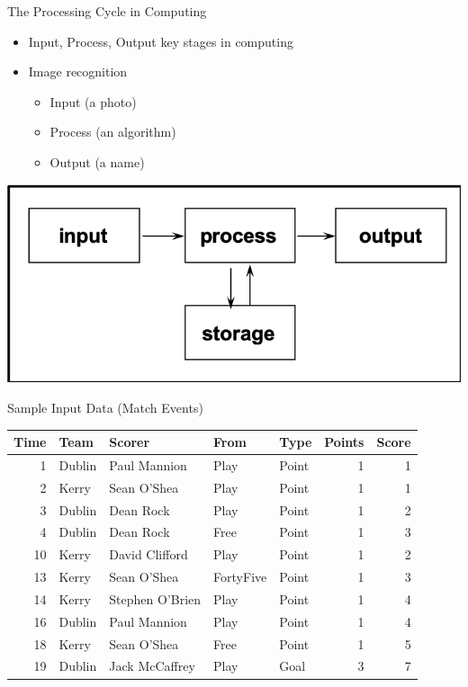 \documentclass[ignorenonframetext,]{beamer}
\providecommand{\tightlist}{%
  \setlength{\itemsep}{0pt}\setlength{\parskip}{0pt}}
\begin{document}
\begin{frame}{The Processing Cycle in Computing}
\protect\hypertarget{the-processing-cycle-in-computing}{}

\begin{itemize}
\tightlist
\item
  Input, Process, Output key stages in computing
\item
  Image recognition

  \begin{itemize}
  \tightlist
  \item
    Input (a photo)
  \item
    Process (an algorithm)
  \item
    Output (a name)
  \end{itemize}
\end{itemize}

\includegraphics[width=0.7\linewidth]{images/01 Processing}

\end{frame}

\begin{frame}{Sample Input Data (Match Events)}
\protect\hypertarget{sample-input-data-match-events}{}

\begin{longtable}[]{@{}rllllrr@{}}
\toprule
Time & Team & Scorer & From & Type & Points & Score\tabularnewline
\midrule
\endhead
1 & Dublin & Paul Mannion & Play & Point & 1 & 1\tabularnewline
2 & Kerry & Sean O'Shea & Play & Point & 1 & 1\tabularnewline
3 & Dublin & Dean Rock & Play & Point & 1 & 2\tabularnewline
4 & Dublin & Dean Rock & Free & Point & 1 & 3\tabularnewline
10 & Kerry & David Clifford & Play & Point & 1 & 2\tabularnewline
13 & Kerry & Sean O'Shea & FortyFive & Point & 1 & 3\tabularnewline
14 & Kerry & Stephen O'Brien & Play & Point & 1 & 4\tabularnewline
16 & Dublin & Paul Mannion & Play & Point & 1 & 4\tabularnewline
18 & Kerry & Sean O'Shea & Free & Point & 1 & 5\tabularnewline
19 & Dublin & Jack McCaffrey & Play & Goal & 3 & 7\tabularnewline
\bottomrule
\end{longtable}

\end{frame}
\end{document}
